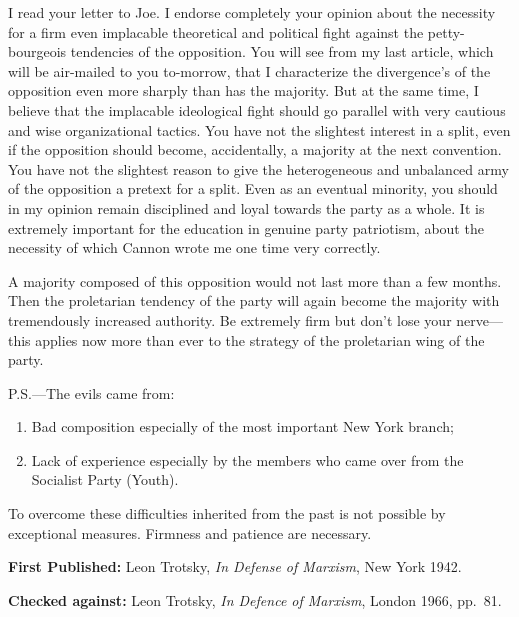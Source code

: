 

I read your letter to Joe. I endorse completely your opinion about the necessity for a firm even implacable theoretical and political fight against the petty-bourgeois tendencies of the opposition. You will see from my last article, which will be air-mailed to you to-morrow, that I characterize the divergence’s of the opposition even more sharply than has the majority. But at the same time, I believe that the implacable ideological fight should go parallel with very cautious and wise organizational tactics. You have not the slightest interest in a split, even if the opposition should become, accidentally, a majority at the next convention. You have not the slightest reason to give the heterogeneous and unbalanced army of the opposition a pretext for a split. Even as an eventual minority, you should in my opinion remain disciplined and loyal towards the party as a whole. It is extremely important for the education in genuine party patriotism, about the necessity of which Cannon wrote me one time very correctly.

A majority composed of this opposition would not last more than a few months. Then the proletarian tendency of the party will again become the majority with tremendously increased authority. Be extremely firm but don’t lose your nerve---this applies now more than ever to the strategy of the proletarian wing of the party.


\begin{postscriptum}
  P.S.---The evils came from:
  \begin{enumerate}
    \item Bad composition especially of the most important New York branch;
    \item Lack of experience especially by the members who came over from the Socialist Party (Youth).
  \end{enumerate}
  To overcome these difficulties inherited from the past is not possible by exceptional measures. Firmness and patience are necessary.
\end{postscriptum}

\begin{letterinfo}
	\textbf{First Published:} Leon Trotsky, \emph{In Defense of Marxism}, New York 1942.
	
	\textbf{Checked against:} Leon Trotsky, \emph{In Defence of Marxism}, London 1966, pp.~81.
\end{letterinfo}